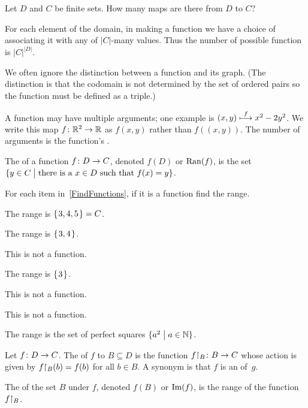 \documentclass{ibl}
\begin{document}
\begin{ex}
Let $D$ and $C$ be finite sets.
How many maps are there from $D$ to $C$?
\begin{ans}
For each element of the domain, in making a function we have a choice 
of associating it with any of $|C|$-many values.
Thus the number of possible function is $|C|^{|D|}$.
\end{ans}
\end{ex}

We often ignore the distinction between a function and its graph.
(The distinction is that the codomain is not determined
by the set of ordered pairs so the function must be 
defined as a triple.)

A function may have multiple arguments; one example is 
$(x,y)\stackrel{f}{\longmapsto}x^2-2y^2$.
We write this map $\mbox{$f\colon \mathbb{R}^2\to \mathbb{R}$}$ as 
$f(x,y)$ rather than
$f((x,y))$.
The number of arguments is the function's .

\begin{df}
The  of a function $\mbox{$f\colon D\to C$}$,
denoted  $f(D)$ or $\operatorname{Ran}(f)$,
is the set
$\{y\in C \bigm| \text{there is a $x\in D$ such that $f(x)=y$}\}$.
\end{df}

\begin{ex}
For each item in~\cref{FindFunctions}, if it is a function find the range.  
\begin{ans}
\begin{exes}
\item The range is $\mbox{$\{\hspace{0.1em}3,4,5\hspace{0.1em}\}$}=C$.    
\item The range is $\mbox{$\{\hspace{0.1em}3,4\hspace{0.1em}\}$}$.
\item This is not a function.   
\item The range is $\mbox{$\{\hspace{0.1em}3\hspace{0.1em}\}$}$.
\item This is not a function.   
\item This is not a function.   
\item The range is the set of perfect squares $\{a^2 \bigm| a\in\mathbb{N}\}$.   
\end{exes}
\end{ans}
\end{ex}

\begin{df}
Let $\mbox{$f\colon D\to C$}$.
The  of $f$ to $B\subseteq D$ is
the function $\mbox{${f}\mathord\upharpoonright_{B}\colon B\to C$}$ whose action is given by 
${f}\mathord\upharpoonright_{B}(b)=f(b)$ for all $b\in B$.
A synonym is that
$f$ is an  of~$g$.

The  of the set $B$ under $f$, 
denoted $f(B)$ or $\operatorname{Im}(f)$,
is the range of the function ${f}\mathord\upharpoonright_{B}$.
\end{df}
\end{document}
